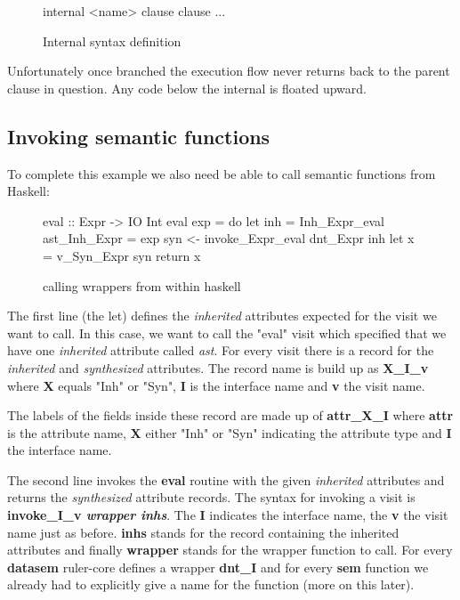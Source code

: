 \begin{figure}[h!]
\begin{code}
internal <name>
  {clause}
  {clause}
  ...
\end{code}
\caption{Internal syntax definition}
\label{internal:syntax}
\end{figure}

Unfortunately once branched the execution flow never returns back to the parent clause in question. Any code below the internal is floated upward.

\subsection{Invoking semantic functions}
To complete this example we also need be able to call semantic functions from Haskell:

\begin{figure}[H]
\begin{code}
eval :: Expr -> IO Int
eval exp = do
  let inh = Inh_Expr_eval { ast_Inh_Expr = exp }
  syn <- invoke_Expr_eval dnt_Expr inh
  let x = v_Syn_Expr syn
  return x
\end{code}
\caption{calling wrappers from within haskell}
\end{figure}

The first line (the let) defines the \emph{inherited} attributes expected for the visit we want to call. In this case, we want to call the "eval" visit which specified that we have one \emph{inherited} attribute called \emph{ast}. For every visit there is a record for the \emph{inherited} and \emph{synthesized} attributes. The record name is build up as \textbf{X\_I\_v} where \textbf{X} equals "Inh" or "Syn", \textbf{I} is the interface name and \textbf{v} the visit name.

The labels of the fields inside these record are made up of \textbf{attr\_X\_I} where \textbf{attr} is the attribute name, \textbf{X} either "Inh" or "Syn" indicating the attribute type and \textbf{I} the interface name.

The second line invokes the \textbf{eval} routine with the given \emph{inherited} attributes and returns the \emph{synthesized} attribute records. The syntax for invoking a visit is \textbf{invoke\_I\_v \emph{wrapper inhs}}. The \textbf{I} indicates the interface name, the \textbf{v} the visit name just as before. \textbf{inhs} stands for the record containing the inherited attributes and finally \textbf{wrapper} stands for the wrapper function to call. For every \textbf{datasem} ruler-core defines a wrapper \textbf{dnt\_I} and for every \textbf{sem} function we already had to explicitly give a name for the function (more on this later).

